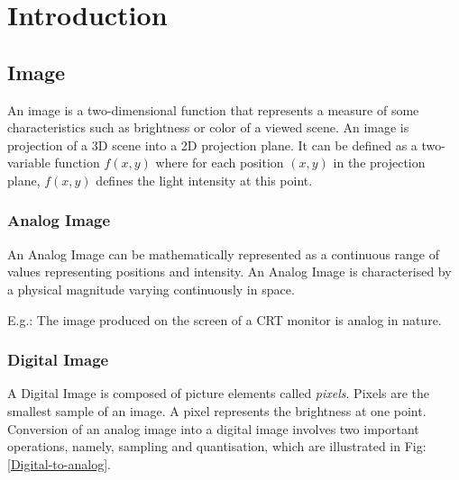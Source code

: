 \chapter{Introduction}

\section{Image}

An image is a two-dimensional function that represents a measure of some characteristics such as brightness or color of a viewed scene. An image is projection of a 3D scene into a 2D projection plane. It can be defined as a two-variable function $f(x,y)$ where for each position $(x,y)$ in the projection plane, $f(x,y)$ defines the light intensity at this point.

\subsection{Analog Image}

An Analog Image can be mathematically represented as a continuous range of values representing positions and intensity. An Analog Image is characterised by a physical magnitude varying continuously in space.

E.g.: The image produced on the screen of a CRT monitor is analog in nature.

\subsection{Digital Image}

A Digital Image is composed of picture elements called \textit{pixels}. Pixels are the smallest sample of an image. A pixel represents the brightness at one point. Conversion of an analog image into a digital image involves two important operations, namely, sampling and quantisation, which are illustrated in Fig: \ref{Digital-to-analog}.

